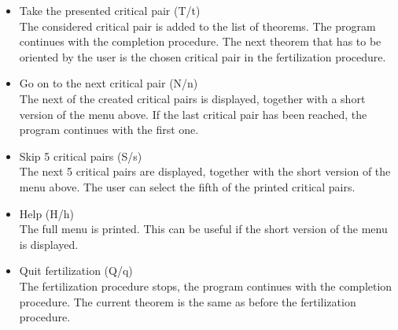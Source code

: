 \begin{itemize}
\item Take the presented critical pair (T/t)\\
The considered critical pair is added to the list of theorems.  The
program continues with the completion procedure. The next theorem that
has to be oriented by the user is the chosen critical pair in the
fertilization procedure.

\item Go on to the next critical pair (N/n)\\
The next of the created critical pairs is displayed, together with a
short version of the menu above. If the last critical pair has been
reached, the program continues with the first one.

\item Skip 5 critical pairs (S/s)\\
The next 5 critical pairs are displayed, together with the short
version of the menu above. The user can select the fifth of the printed
critical pairs.

\item Help (H/h)\\
The full menu is printed. This can be useful if the short version of
the menu is displayed.

\item Quit fertilization (Q/q)\\
The fertilization procedure stops, the program continues with the
completion procedure. The current theorem is the same as before the
fertilization procedure.
\end{itemize}
